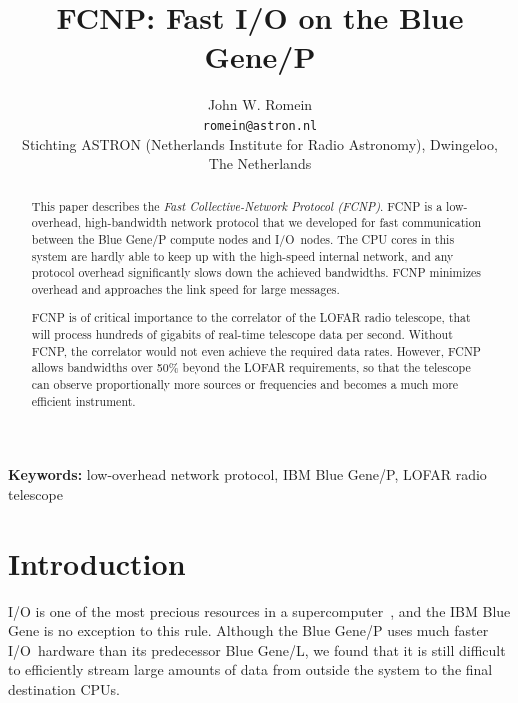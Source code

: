 \documentclass[journal]{IEEEtran}
\begin{document}
\title{FCNP: Fast I/O on the Blue Gene/P}


\author{John W. Romein \\[3mm]
\texttt{romein@astron.nl}\\
Stichting ASTRON (Netherlands Institute for Radio Astronomy), Dwingeloo, The Netherlands}

\newcommand{\us}{\,$\muup$s\xspace}
\newcommand{\ns}{\,ns\xspace}

\maketitle

\begin{abstract}
This paper describes the \emph{Fast Collective-Network Protocol (FCNP)}.
FCNP is a low-overhead, high-bandwidth network protocol that we developed for
fast communication between the Blue Gene/P compute nodes and I/O~nodes.
The CPU cores in this system are hardly able to keep up with the high-speed
internal network, and any protocol overhead significantly slows down the
achieved bandwidths.
FCNP minimizes overhead and approaches the link speed for large messages.

FCNP is of critical importance to the correlator of the LOFAR radio telescope,
that will process hundreds of gigabits of real-time telescope data per second.
Without FCNP, the correlator would not even achieve the required data rates.
However, FCNP allows bandwidths over 50\% beyond the LOFAR requirements,
so that the telescope can observe proportionally more sources or frequencies
and becomes a much more efficient instrument.
\end{abstract}

\vspace{4mm}\noindent
\textbf{Keywords:} low-overhead network protocol, IBM Blue Gene/P, LOFAR radio telescope


\section{Introduction}

I/O is one of the most precious resources in a supercomputer~\cite{Iskra:08},
and the IBM Blue Gene is no exception to this rule.
Although the Blue Gene/P uses much faster I/O~hardware than
its predecessor Blue Gene/L, we found that it is still difficult to
efficiently stream large amounts of data from outside the system to the
final destination CPUs.
\end{document}
